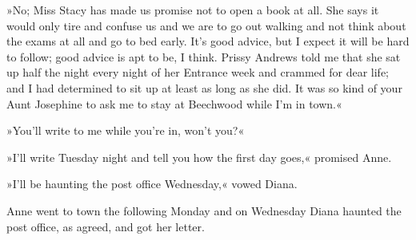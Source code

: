 »No; Miss Stacy has made us promise not to open a book at all. She says it would only tire and confuse us and we are to go out walking and not think about the exams at all and go to bed early. It’s good advice, but I expect it will be hard to follow; good advice is apt to be, I think. Prissy Andrews told me that she sat up half the night every night of her Entrance week and crammed for dear life; and I had determined to sit up at least as long as she did. It was so kind of your Aunt Josephine to ask me to stay at Beechwood while I’m in town.«

»You’ll write to me while you’re in, won’t you?«

»I’ll write Tuesday night and tell you how the first day goes,« promised Anne.

»I’ll be haunting the post office Wednesday,« vowed Diana.

Anne went to town the following Monday and on Wednesday Diana haunted the post office, as agreed, and got her letter.

